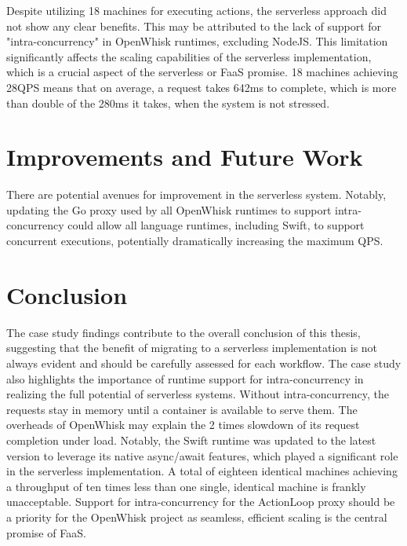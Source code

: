 Despite utilizing 18 machines for executing actions, the serverless approach did not show any clear benefits. This may be attributed to the lack of support for "intra-concurrency" in OpenWhisk runtimes, excluding NodeJS. This limitation significantly affects the scaling capabilities of the serverless implementation, which is a crucial aspect of the serverless or FaaS promise. 18 machines achieving 28QPS means that on average, a request takes 642ms to complete, which is more than double of the 280ms it takes, when the system is not stressed.

\section{Improvements and Future Work}

There are potential avenues for improvement in the serverless system. Notably, updating the Go proxy used by all OpenWhisk runtimes to support intra-concurrency could allow all language runtimes, including Swift, to support concurrent executions, potentially dramatically increasing the maximum QPS.

\section{Conclusion}

The case study findings contribute to the overall conclusion of this thesis, suggesting that the benefit of migrating to a serverless implementation is not always evident and should be carefully assessed for each workflow. The case study also highlights the importance of runtime support for intra-concurrency in realizing the full potential of serverless systems. Without intra-concurrency, the requests stay in memory until a container is available to serve them. The overheads of OpenWhisk may explain the 2 times slowdown of its request completion under load. Notably, the Swift runtime was updated to the latest version to leverage its native async/await features, which played a significant role in the serverless implementation. A total of eighteen identical machines achieving a throughput of ten times less than one single, identical machine is frankly unacceptable. Support for intra-concurrency for the ActionLoop proxy should be a priority for the OpenWhisk project as seamless, efficient scaling is the central promise of FaaS.

